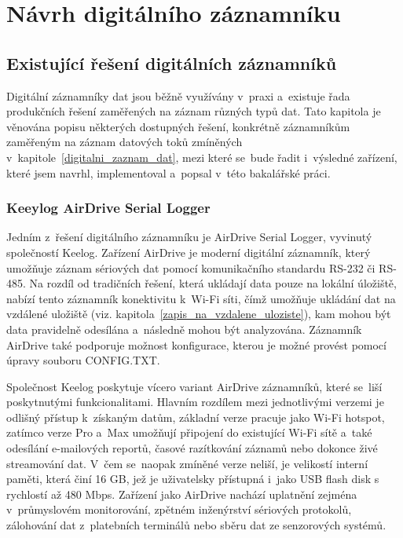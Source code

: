 \chapter{Návrh digitálního záznamníku}
\label{navrh_digitalniho_zaznamniku}

\section{Existující řešení digitálních záznamníků}
\label{existujici_reseni}
Digitální záznamníky dat jsou běžně využívány v~praxi a~existuje řada produkčních řešení zaměřených na záznam různých typů dat. Tato kapitola je věnována popisu některých dostupných řešení, konkrétně záznamníkům zaměřeným na záznam datových toků zmíněných v~kapitole~\ref{digitalni_zaznam_dat}, mezi které se~bude řadit i~výsledné zařízení, které jsem navrhl, implementoval a~popsal v~této bakalářské práci. 

\subsection{Keeylog AirDrive Serial Logger}
\label{keelog_airdrive_serial_datalogger}
Jedním z~řešení digitálního záznamníku je AirDrive Serial Logger, vyvinutý společností Keelog. Zařízení AirDrive je moderní digitální záznamník, který umožňuje záznam sériových dat pomocí komunikačního standardu RS-232 či RS-485. Na rozdíl od tradičních řešení, která ukládají data pouze na lokální úložiště, nabízí tento záznamník konektivitu k~Wi-Fi síti, čímž umožňuje ukládání dat na vzdálené uložiště (viz. kapitola~\ref{zapis_na_vzdalene_uloziste}), kam mohou být data pravidelně odesílána a~následně mohou být analyzována. Záznamník AirDrive také podporuje možnost konfigurace, kterou je možné provést pomocí úpravy souboru 
CONFIG.TXT.~\cite{keelog_airdrive_serial_datalogger, keelog_airdrive_serial_datalogger_max, keelog_airdrive_serial_datalogger_pro}

Společnost Keelog poskytuje vícero variant AirDrive záznamníků, které se~liší poskytnutými funkcionalitami. Hlavním rozdílem mezi jednotlivými verzemi je odlišný přístup k~získaným datům, základní verze pracuje jako Wi-Fi hotspot, zatímco verze Pro a~Max umožňují připojení do existující Wi-Fi sítě a~také odesílání e-mailových reportů, časové razítkování záznamů nebo dokonce živé streamování dat. V~čem se~naopak zmíněné verze neliší, je velikostí interní paměti, která činí 16 GB, jež je uživatelsky přístupná i~jako USB flash disk s rychlostí až 480 Mbps. Zařízení jako AirDrive nachází uplatnění zejména v~průmyslovém monitorování, zpětném inženýrství sériových protokolů, zálohování dat z~platebních terminálů nebo sběru dat ze senzorových systémů.~\cite{keelog_airdrive_serial_datalogger, keelog_airdrive_serial_datalogger_max, keelog_airdrive_serial_datalogger_pro}

